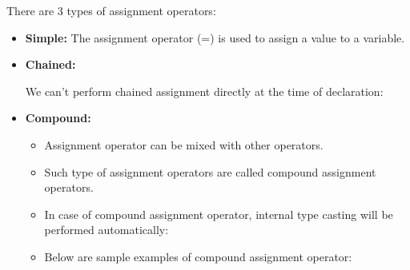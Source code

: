 
\begin{flushleft}
	
	There are 3 types of assignment operators:
	\begin{itemize}
		\item \textbf{Simple:}  The assignment operator (=) is used to assign a value to a variable.
		\bigskip
		\item \textbf{Chained:} 
		\bigskip
	
		We can’t perform chained assignment directly at the time of declaration:
		\bigskip
		
		\item \textbf{Compound:} 
		\begin{itemize}
			\item Assignment operator can be mixed with other operators.
			\item Such type of assignment operators are called compound assignment operators.
			\bigskip
			\bigskip
			
			\item In case of compound assignment operator, internal type casting will be performed automatically:
			\bigskip
			\bigskip
			\item Below are sample examples of compound assignment operator:
		\end{itemize}
		 
		
		
		
	\end{itemize}
	
	
	
	
\end{flushleft}
\newpage